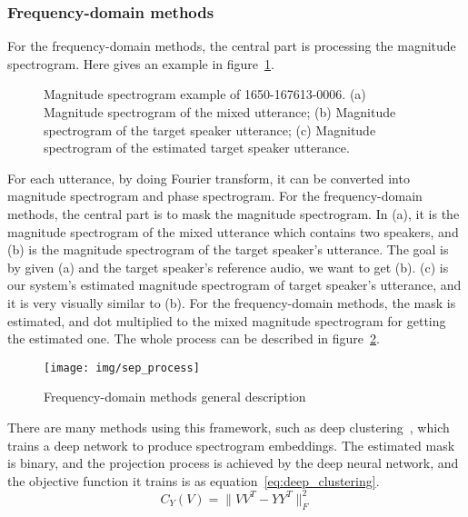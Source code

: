 \subsubsection{Frequency-domain methods}

For the frequency-domain methods, the central part is processing the magnitude spectrogram. Here gives an example in figure~\ref{fig:spec_exp}.
\begin{figure}
    \centering
    \caption{Magnitude spectrogram example of 1650-167613-0006. (a) Magnitude spectrogram of the mixed utterance; (b) Magnitude spectrogram of the target speaker utterance; (c) Magnitude spectrogram of the estimated target speaker utterance. }
    \label{fig:spec_exp}
\end{figure}

For each utterance, by doing Fourier transform, it can be converted into magnitude spectrogram and phase spectrogram.
For the frequency-domain methods, the central part is to mask the magnitude spectrogram.
In (a), it is the magnitude spectrogram of the mixed utterance which contains two speakers, and (b) is the magnitude spectrogram of the target speaker's utterance.
The goal is by given (a) and the target speaker's reference audio, we want to get (b). (c) is our system's estimated magnitude spectrogram of target speaker's utterance, and it is very visually similar to (b).
For the frequency-domain methods, the mask is estimated, and dot multiplied to the mixed magnitude spectrogram for getting the estimated one.
The whole process can be described in figure~\ref{fig:sep_process}.
\begin{figure}[!htbp]
    \centering
    \texttt{[image: img/sep\_process]}
    \caption{Frequency-domain methods general description}
    \label{fig:sep_process}
\end{figure}

There are many methods using this framework, such as deep clustering~\cite{deep_clustering}, which trains a deep network to produce spectrogram embeddings.
The estimated mask is binary, and the projection process is achieved by the deep neural network, and the objective function it trains is as equation~\ref{eq:deep_clustering}.
\begin{equation}
    C_Y\left( V \right) = \| VV^T - YY^T \|_F^2
    \label{eq:deep_clustering}
\end{equation}

